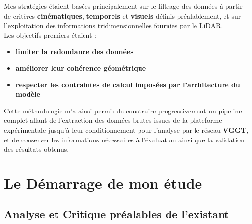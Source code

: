 \documentclass[12pt,a4paper,oneside]{report}
\begin{document}
\bigskip

\hspace*{.3cm}Mes stratégies étaient basées principalement sur le filtrage des données à partir de critères \textbf{cinématiques}, \textbf{temporels} et \textbf{visuels} définis préalablement, et sur l'exploitation des informations tridimensionnelles fournies par le LiDAR.\\
Les objectifs premiers étaient :
\begin{itemize}[label=\textbullet]
    \item \textbf{limiter la redondance des données}
    \item \textbf{améliorer leur cohérence géométrique}
    \item \textbf{respecter les contraintes de calcul imposées par l'architecture du modèle}
\end{itemize}

\bigskip
\bigskip

\hspace*{.3cm}Cette méthodologie m'a ainsi permis de construire progressivement un pipeline complet allant de l'extraction des données brutes issues de la plateforme expérimentale jusqu'à leur conditionnement pour l'analyse par le réseau \textbf{VGGT}, et de conserver les informations nécessaires à l'évaluation ainsi que la validation des résultats obtenus.

\newpage

\chapter{Le Démarrage de mon étude}

\section{Analyse et Critique préalables de l'existant}
\end{document}
